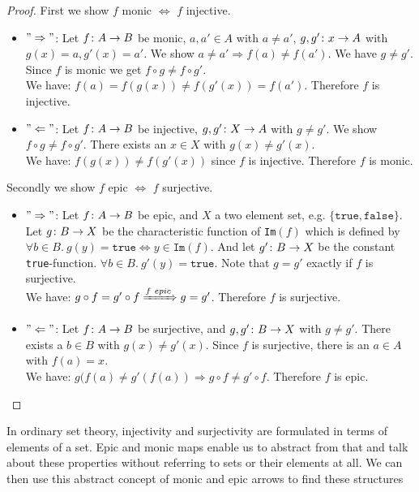 \begin{proof}
  First we show $f$ monic $\Leftrightarrow$ $f$ injective.
  \begin{itemize}
  \item $"\Rightarrow"$: Let $f \from A \to B$ be monic, $a, a' \in A$ with $a \neq a'$, $g, g' \from {x} \to A$ with $g(x) = a, g'(x) = a'$.
    We show $a \neq a' \Rightarrow f(a) \neq f(a')$.
    We have $g \neq g'$.
    Since $f$ is monic we get $f \circ g \neq f \circ g'$.\\
    We have: $f(a) = f(g(x)) \neq f(g'(x)) = f(a')$. Therefore $f$ is injective.
  \item $"\Leftarrow"$: Let $f \from A \to B$ be injective, $g, g' \from X \to A$ with $g \neq g'$.
    We show $f \circ g \neq f \circ g'$.
    There exists an $x \in X$ with $g(x) \neq g'(x)$.\\
    We have: $f(g(x)) \neq f(g'(x))$ since $f$ is injective.
    Therefore $f$ is monic.
  \end{itemize}
  Secondly we show $f$ epic $\Leftrightarrow$ $f$ surjective.
  \begin{itemize}
  \item $"\Rightarrow"$: Let $f \from A \to B$ be epic, and $X$ a two element set, e.g. $\{ \texttt{true}, \texttt{false}\}$.
    Let $g \from B \to X$ be the characteristic function of \texttt{Im}$(f)$ which is defined by
    $\forall b \in B. \ g(y) = \texttt{true}
    \Leftrightarrow y \in \texttt{Im}(f)$.
    And let $g' \from B \to X$ be the constant \texttt{true}-function.
    $\forall b \in B. \ g'(y) = \texttt{true}$.
    Note that $g = g'$ exactly if $f$ is surjective.\\
    We have: $g \of f = g' \of f \xRightarrow{f \ epic} g = g'$.
    Therefore $f$ is surjective.
  \item $"\Leftarrow"$: Let $f \from A \to B$ be surjective, and $g, g' \from B \to X$ with $g \neq g'$.
    There exists a $b \in B$ with $g(x) \neq g'(x)$.
    Since $f$ is surjective, there is an $a \in A$ with $f(a) = x$.\\
    We have: $g(f(a) \neq g'(f(a)) \Rightarrow g \circ f \neq g' \circ f$.
    Therefore $f$ is epic.
  \end{itemize}
\end{proof}
In ordinary set theory, injectivity and surjectivity are formulated in terms of elements of a set.
Epic and monic maps enable us to abstract from that and
talk about these properties without referring to sets or their elements at all.
We can then use this abstract concept of monic and epic arrows to find these structures
